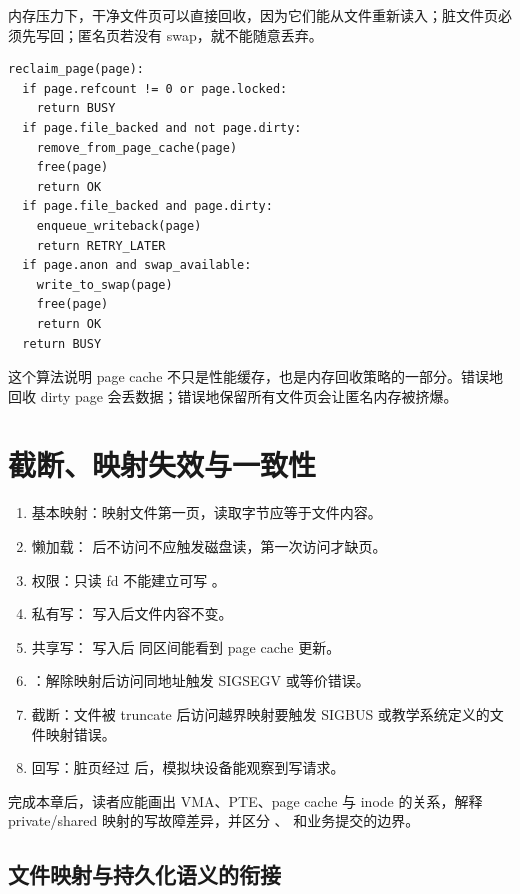 内存压力下，干净文件页可以直接回收，因为它们能从文件重新读入；脏文件页必须先写回；匿名页若没有 swap，就不能随意丢弃。

\begin{lstlisting}
reclaim_page(page):
  if page.refcount != 0 or page.locked:
    return BUSY
  if page.file_backed and not page.dirty:
    remove_from_page_cache(page)
    free(page)
    return OK
  if page.file_backed and page.dirty:
    enqueue_writeback(page)
    return RETRY_LATER
  if page.anon and swap_available:
    write_to_swap(page)
    free(page)
    return OK
  return BUSY
\end{lstlisting}

这个算法说明 page cache 不只是性能缓存，也是内存回收策略的一部分。错误地回收 dirty page 会丢数据；错误地保留所有文件页会让匿名内存被挤爆。

\section{截断、映射失效与一致性}

\begin{enumerate}
\tightlist
\item 基本映射：映射文件第一页，读取字节应等于文件内容。
\item 懒加载： 后不访问不应触发磁盘读，第一次访问才缺页。
\item 权限：只读 fd 不能建立可写 。
\item 私有写： 写入后文件内容不变。
\item 共享写： 写入后  同区间能看到 page cache 更新。
\item {}：解除映射后访问同地址触发 SIGSEGV 或等价错误。
\item 截断：文件被 truncate 后访问越界映射要触发 SIGBUS 或教学系统定义的文件映射错误。
\item 回写：脏页经过  后，模拟块设备能观察到写请求。
\end{enumerate}

\begin{rubricbox}
完成本章后，读者应能画出 VMA、PTE、page cache 与 inode 的关系，解释 private/shared
映射的写故障差异，并区分 、 和业务提交的边界。
\end{rubricbox}

\subsection{文件映射与持久化语义的衔接}

